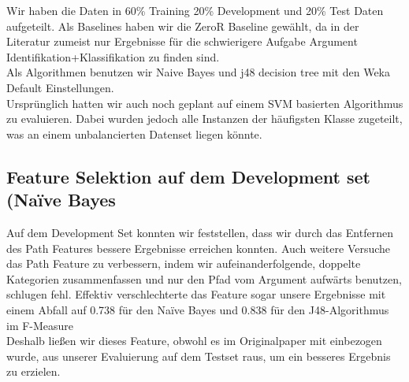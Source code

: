 \documentclass[]{article}
\begin{document}
Wir haben die Daten in 60\% Training 20\% Development und 20\% Test Daten aufgeteilt. 
Als Baselines haben wir die ZeroR Baseline gewählt, da in der Literatur zumeist nur Ergebnisse für die schwierigere Aufgabe Argument Identifikation+Klassifikation zu finden sind. \\
Als Algorithmen benutzen wir Naive Bayes und j48 decision tree mit den Weka Default Einstellungen. \\
Ursprünglich hatten wir auch noch geplant auf einem SVM basierten Algorithmus zu evaluieren. 
Dabei wurden jedoch alle Instanzen der häufigsten Klasse zugeteilt, was an einem unbalancierten Datenset liegen könnte.

\subsection{Feature Selektion auf dem Development set (Naïve Bayes}
\begin{table}[h]
\end{table}

Auf dem Development Set konnten wir feststellen, dass wir durch das Entfernen des Path Features bessere Ergebnisse erreichen konnten.
Auch weitere Versuche das Path Feature zu verbessern, indem wir aufeinanderfolgende, doppelte Kategorien zusammenfassen und nur den Pfad vom Argument aufwärts benutzen, schlugen fehl. Effektiv verschlechterte das Feature sogar unsere Ergebnisse mit einem Abfall auf 0.738 für den Naïve Bayes und 0.838 für den J48-Algorithmus im F-Measure \\
Deshalb ließen wir dieses Feature, obwohl es im Originalpaper \citep{Pradhan05supportvector} mit einbezogen wurde, aus unserer Evaluierung auf dem Testset raus, um ein besseres Ergebnis zu erzielen. 
\end{document}
